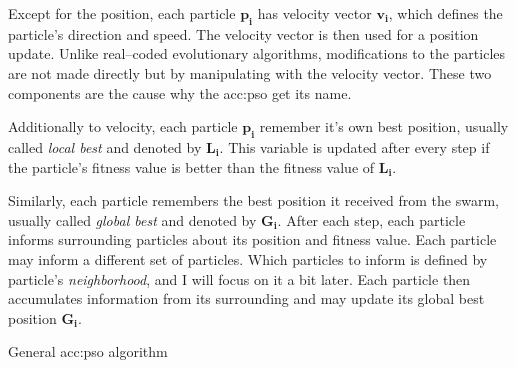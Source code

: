 Except for the position, each particle $\mathbf{p_i}$ has velocity vector $\mathbf{v_i}$, which defines the particle's direction and speed. The velocity vector is then used for a position update. Unlike real--coded evolutionary algorithms, modifications to the particles are not made directly but by manipulating with the velocity vector. These two components are the cause why the \acrshort{acc:pso} get its name.

Additionally to velocity, each particle $\mathbf{p_i}$ remember it's own best position, usually called \emph{local best} and denoted by $\mathbf{L_i}$. This variable is updated after every step if the particle's fitness value is better than the fitness value of $\mathbf{L_i}$.

Similarly, each particle remembers the best position it received from the swarm, usually called \emph{global best} and denoted by $\mathbf{G_i}$. After each step, each particle informs surrounding particles about its position and fitness value. Each particle may inform a different set of particles. Which particles to inform is defined by particle's \emph{neighborhood}, and I will focus on it a bit later. Each particle then accumulates information from its surrounding and may update its global best position $\mathbf{G_i}$.

\begin{algorithm}
    \caption{General \acrfull*{acc:pso} algorithm}
    \label{alg:PSOgeneral}
\end{algorithm}

